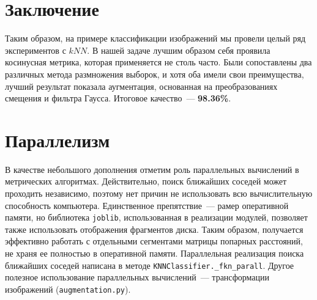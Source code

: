 \documentclass[12pt]{article}
\begin{document}
\section{Заключение}
Таким образом, на примере классификации изображений мы провели целый ряд экспериментов с $kNN$. В нашей задаче лучшим образом себя проявила косинусная метрика, которая применяется не столь часто. Были сопоставлены два различных метода размножения выборок, и хотя оба имели свои преимущества, лучший результат показала аугментация, основанная на преобразованиях смещения и фильтра Гаусса. Итоговое качество~--- \textbf{98.36\%}.


\section{Параллелизм}
В качестве небольшого дополнения отметим роль параллельных вычислений в метрических алгоритмах. Действительно, поиск ближайших соседей может проходить независимо, поэтому нет причин не использовать всю вычислительную способность компьютера. Единственное препятствие~--- рамер оперативной памяти, но библиотека \verb|joblib|, использованная в реализации модулей, позволяет также использовать отображения фрагментов диска. Таким образом, получается эффективно работать с отдельными сегментами матрицы попарных расстояний, не храня ее полностью в оперативной памяти. Параллельная реализация поиска ближайших соседей написана в методе \verb|KNNClassifier._fkn_parall|. Другое полезное использование параллельных вычислений~--- трансформации изображений (\verb|augmentation.py|).

\printbibliography
\end{document}

